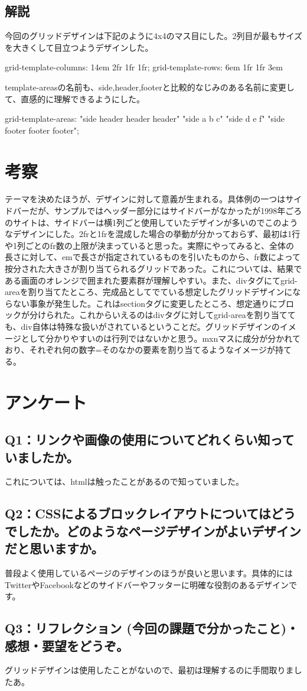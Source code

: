 \documentclass[12pt,a4j]{jarticle}
\begin{document}
\subsection{解説}

今回のグリッドデザインは下記のように4x4のマス目にした。2列目が最もサイズを大きくして目立つようデザインした。

            grid-template-columns: 14em 2fr 1fr 1fr;
            grid-template-rows: 6em 1fr 1fr 3em
            
template-areasの名前も、side,header,footerと比較的なじみのある名前に変更して、直感的に理解できるようにした。
            
            grid-template-areas: "side header header header" "side a b c" "side d e f" "side footer footer footer";

\section{考察}

テーマを決めたほうが、デザインに対して意義が生まれる。具体例の一つはサイドバーだが、サンプルではヘッダー部分にはサイドバーがなかったが1998年ごろのサイトは、サイドバーは横1列ごと使用していたデザインが多いのでこのようなデザインにした。2frと1frを混成した場合の挙動が分かっておらず、最初は1行や1列ごとのfr数の上限が決まっていると思った。実際にやってみると、全体の長さに対して、emで長さが指定されているものを引いたものから、fr数によって按分された大きさが割り当てられるグリッドであった。これについては、結果である画面のオレンジで囲まれた要素群が理解しやすい。また、divタグにてgrid-areaを割り当てたところ、完成品としてでている想定したグリッドデザインにならない事象が発生した。これはsectionタグに変更したところ、想定通りにブロックが分けられた。これからいえるのはdivタグに対してgrid-areaを割り当てても、div自体は特殊な扱いがされているということだ。グリッドデザインのイメージとして分かりやすいのは行列ではないかと思う。mxnマスに成分が分かれており、それぞれ何の数字=そのなかの要素を割り当てるようなイメージが持てる。

\section{アンケート}

\subsection{Q1：リンクや画像の使用についてどれくらい知っていましたか。}
これについては、htmlは触ったことがあるので知っていました。

\subsection{Q2：CSSによるブロックレイアウトについてはどうでしたか。どのようなページデザインがよいデザインだと思いますか。}
普段よく使用しているページのデザインのほうが良いと思います。具体的にはTwitterやFacebookなどのサイドバーやフッターに明確な役割のあるデザインです。

\subsection{Q3：リフレクション (今回の課題で分かったこと)・感想・要望をどうぞ。}
グリッドデザインは使用したことがないので、最初は理解するのに手間取りましたあ。
\end{document}
